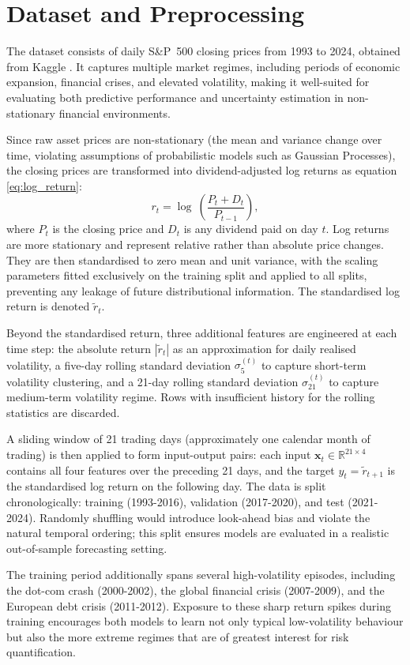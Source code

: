 \section{Dataset and Preprocessing}
\label{sec:dataset}

The dataset consists of daily S\&P~500 closing prices from 1993 to 2024, obtained from Kaggle \parencite{sp500}. It captures multiple market regimes, including periods of economic expansion, financial crises, and elevated volatility, making it well-suited for evaluating both predictive performance and uncertainty estimation in non-stationary financial environments.

Since raw asset prices are non-stationary (the mean and variance change over time, violating assumptions of probabilistic models such as Gaussian Processes), the closing prices are transformed into dividend-adjusted log returns as equation \ref{eq:log_return}:
\begin{equation}
    r_t = \log\ \left(\frac{P_t + D_t}{P_{t-1}}\right),
    \label{eq:log_return}
\end{equation}
where $P_t$ is the closing price and $D_t$ is any dividend paid on day $t$. Log returns are more stationary and represent relative rather than absolute price changes. They are then standardised to zero mean and unit variance, with the scaling parameters fitted exclusively on the training split and applied to all splits, preventing any leakage of future distributional information. The standardised log return is denoted $\tilde{r}_t$.

Beyond the standardised return, three additional features are engineered at each time step: the absolute return $|\tilde{r}_t|$ as an approximation for daily realised volatility, a five-day rolling standard deviation $\sigma_5^{(t)}$ to capture short-term volatility clustering, and a 21-day rolling standard deviation $\sigma_{21}^{(t)}$ to capture medium-term volatility regime. Rows with insufficient history for the rolling statistics are discarded.

A sliding window of 21 trading days (approximately one calendar month of trading) is then applied to form input-output pairs: each input $\mathbf{x}_t \in \mathbb{R}^{21 \times 4}$ contains all four features over the preceding 21 days, and the target $y_t = \tilde{r}_{t+1}$ is the standardised log return on the following day. The data is split chronologically: training (1993-2016), validation (2017-2020), and test (2021-2024). Randomly shuffling would introduce look-ahead bias and violate the natural temporal ordering; this split ensures models are evaluated in a realistic out-of-sample forecasting setting. 

The training period additionally spans several high-volatility episodes, including the dot-com crash (2000-2002), the global financial crisis (2007-2009), and the European debt crisis (2011-2012). Exposure to these sharp return spikes during training encourages both models to learn not only typical low-volatility behaviour but also the more extreme regimes that are of greatest interest for risk quantification.
